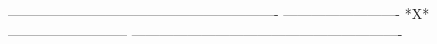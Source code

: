  
 
 
 
 
 
 
 
 
 
 
 
 
 
 
 
----------------------------------------------------------
-------------------------  *X*  --------------------------
----------------------------------------------------------
 
 
 
 
 
 
 
 
 
 
 
 
 
 
 
 
 
 
 
 
 
 
 
 
 
 
 
 
 
 
 
 
 
 
 
 
 
 
 
 
 
 
 
 
 
 
 
 
 
 
 
 
 
 
 
 
 
 
 
 
 
 
 
 
 
 
 
 
 
 
 
 
 
 
 
 
 
 
 
 
 
 
 
 
 
 
 
 
 
 
 
 
 
 
 
